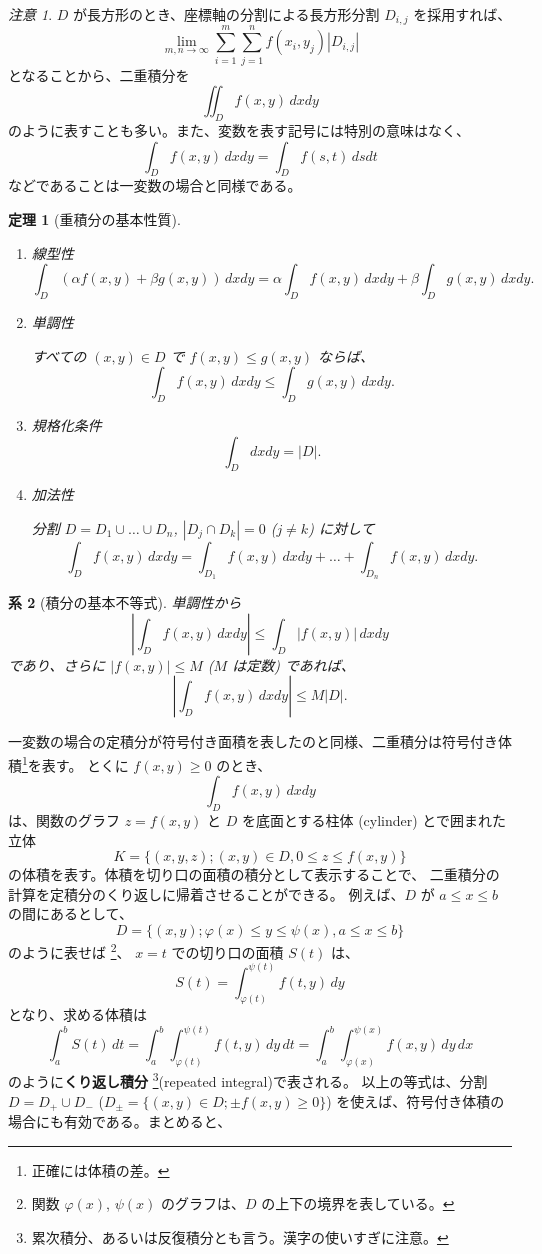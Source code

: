 \documentclass[a4paper]{jsarticle}
\newtheorem{Theorem}{定理}[section]
\newtheorem{Corollary}[Theorem]{系}
\theoremstyle{definition}
\theoremstyle{remark}
\newtheorem{Remark}{注意}
\begin{document}
\begin{Remark}{\small
$D$ が長方形のとき、座標軸の分割による長方形分割 $D_{i,j}$ を採用すれば、
\[
\lim_{m,n \to \infty} \sum_{i=1}^m \sum_{j=1}^n f(x_i,y_j) |D_{i,j}| 
\]
となることから、二重積分を
\[
\iint_D f(x,y)\, dxdy 
\]
のように表すことも多い。また、変数を表す記号には特別の意味はなく、
\[
\int_D f(x,y)\, dxdy = \int_D f(s,t)\, dsdt
\]
などであることは一変数の場合と同様である。}
\end{Remark}

\begin{Theorem}[重積分の基本性質]~ 
\begin{enumerate}
\item{線型性}
\[
\int_D (\alpha f(x,y) + \beta g(x,y))\, dxdy = 
\alpha \int_D f(x,y)\,dxdy + \beta \int_D g(x,y)\, dxdy. 
\]
\item{単調性}

すべての $(x,y) \in D$ で $f(x,y) \leq g(x,y)$ 
ならば、
\[
\int_D f(x,y)\,dxdy \leq \int_D g(x,y)\, dxdy. 
\]
\item{規格化条件}
\[
\int_D dxdy = |D|. 
\]
\item{加法性}

分割 $D = D_1 \cup \dots \cup D_n$, $|D_j \cap D_k| = 0$ {\rm ($j \not= k$)} に対して
\[
\int_D f(x,y)\, dxdy = 
\int_{D_1} f(x,y)\, dxdy 
+ \dots + 
\int_{D_n} f(x,y)\, dxdy. 
\] 
\end{enumerate}
\end{Theorem}

\begin{Corollary}[積分の基本不等式] 
単調性から
\[
\left| \int_D f(x,y)\, dxdy \right| 
\leq \int_D |f(x,y)|\, dxdy 
\]
であり、さらに $|f(x,y)| \leq M$ {\rm ($M$ は定数)} であれば、
\[
\left| \int_D f(x,y)\, dxdy \right| 
\leq M|D|. 
\]
\end{Corollary}

一変数の場合の定積分が符号付き面積を表したのと同様、二重積分は符号付き体積\footnote{正確には体積の差。}を表す。
とくに $f(x,y) \geq 0$ のとき、
\[
\int_D f(x,y)\, dxdy
\]
は、関数のグラフ $z = f(x,y)$ と $D$ を底面とする柱体 (cylinder) とで囲まれた立体 
\[
K = \{ (x,y,z); (x,y) \in D, 0 \leq z \leq f(x,y) \}
\]
の体積を表す。体積を切り口の面積の積分として表示することで、
二重積分の計算を定積分のくり返しに帰着させることができる。
例えば、$D$ が $a \leq x \leq b$ の間にあるとして、
\[
D = \{ (x,y); \varphi(x) \leq y \leq \psi(x), a \leq x \leq b \}
\]
のように表せば
\footnote{関数 $\varphi(x)$, $\psi(x)$ のグラフは、$D$ の上下の境界を表している。}、
$x=t$ での切り口の面積 $S(t)$ は、
\[
S(t) = \int_{\varphi(t)}^{\psi(t)} f(t,y)\, dy
\]
となり、求める体積は
\[
\int_a^b S(t)\, dt = 
\int_a^b \int_{\varphi(t)}^{\psi(t)} f(t,y)\, dy\, dt 
= \int_a^b \int_{\varphi(x)}^{\psi(x)} f(x,y)\, dy\, dx
\]
のように\textbf{くり返し積分}
\footnote{累次積分、あるいは反復積分とも言う。漢字の使いすぎに注意。}(repeated integral)で表される。
以上の等式は、分割 $D = D_+ \cup D_-$ ($D_\pm = \{ (x,y) \in D; \pm f(x,y) \geq 0\}$) を使えば、符号付き体積の場合にも有効である。まとめると、
\end{document}
